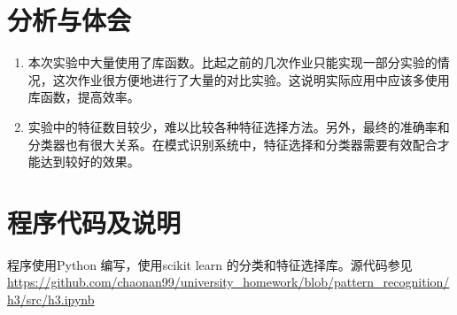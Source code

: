 \section{分析与体会}
\begin{enumerate}
\item 本次实验中大量使用了库函数。比起之前的几次作业只能实现一部分实验的情况，这次作业很方便地进行了大量的对比实验。这说明实际应用中应该多使用库函数，提高效率。
\item 实验中的特征数目较少，难以比较各种特征选择方法。另外，最终的准确率和分类器也有很大关系。在模式识别系统中，特征选择和分类器需要有效配合才能达到较好的效果。
\end{enumerate}

\section{程序代码及说明}
程序使用{\ttfamily Python} 编写，使用{\ttfamily scikit learn} 的分类和特征选择库。源代码参见 \url{https://github.com/chaonan99/university_homework/blob/pattern_recognition/h3/src/h3.ipynb}


